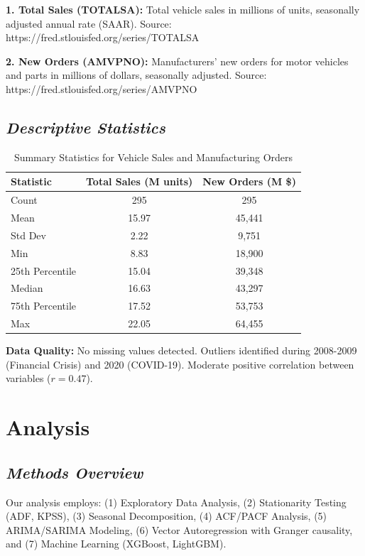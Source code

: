 \documentclass[12pt]{article}
\begin{document}
\textbf{1. Total Sales (TOTALSA):} Total vehicle sales in millions of units, seasonally adjusted annual rate (SAAR). Source: https://fred.stlouisfed.org/series/TOTALSA

\textbf{2. New Orders (AMVPNO):} Manufacturers' new orders for motor vehicles and parts in millions of dollars, seasonally adjusted. Source: https://fred.stlouisfed.org/series/AMVPNO

\subsection*{\textit{Descriptive Statistics}}

\begin{table}[H]
\centering
\caption{Summary Statistics for Vehicle Sales and Manufacturing Orders}
\begin{tabular}{lcc}
\toprule
Statistic & Total Sales (M units) & New Orders (M \$) \\
\midrule
Count & 295 & 295 \\
Mean & 15.97 & 45,441 \\
Std Dev & 2.22 & 9,751 \\
Min & 8.83 & 18,900 \\
25th Percentile & 15.04 & 39,348 \\
Median & 16.63 & 43,297 \\
75th Percentile & 17.52 & 53,753 \\
Max & 22.05 & 64,455 \\
\bottomrule
\end{tabular}
\end{table}

\textbf{Data Quality:} No missing values detected. Outliers identified during 2008-2009 (Financial Crisis) and 2020 (COVID-19). Moderate positive correlation between variables ($r = 0.47$).

\section*{\textbf{Analysis}}

\subsection*{\textit{Methods Overview}}

Our analysis employs: (1) Exploratory Data Analysis, (2) Stationarity Testing (ADF, KPSS), (3) Seasonal Decomposition, (4) ACF/PACF Analysis, (5) ARIMA/SARIMA Modeling, (6) Vector Autoregression with Granger causality, and (7) Machine Learning (XGBoost, LightGBM).
\end{document}
